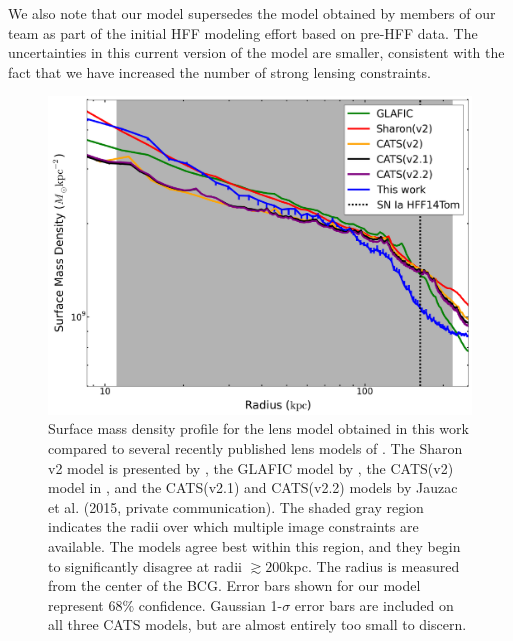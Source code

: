 We also note that our model supersedes the model obtained by members
of our team as part of the initial HFF modeling effort based on
pre-HFF data. The uncertainties in this current version of the model
are smaller, consistent with the fact that we have increased
the number of strong lensing constraints.

\begin{figure}
    \centering
    \includegraphics[width=\textwidth]{fig/surface_mass_density_profile.pdf}
    \caption[Surface mass density profile of our lens model.]{Surface mass density profile for the lens model obtained in this work compared to several recently published lens 
        models of \cler. The Sharon v2 model is presented by \citet{Joh++14}, the GLAFIC model by \citet{Ish++15}, the CATS(v2) 
        model in \citet{2014arXiv1409.8663J}, and the CATS(v2.1) and CATS(v2.2) models by Jauzac et al. (2015, private 
        communication).  The shaded gray region indicates the radii over which multiple image constraints are available. The 
        models agree best within this region, and they begin to significantly disagree at radii $\gtrsim 200$kpc. The radius is 
        measured from the center of the BCG. Error bars shown for our model represent $68\%$ confidence. Gaussian 1-$\sigma$ error 
        bars are included on all three CATS models, but are almost entirely too small to discern.
\label{fig:surfcompare}}
\end{figure}


